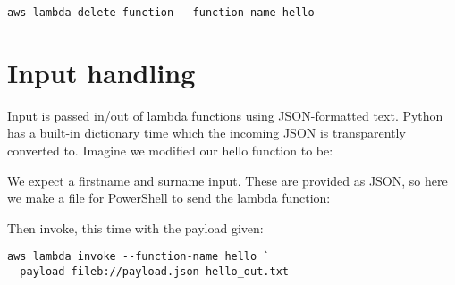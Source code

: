 \documentclass[slides]{pgnotes}
\begin{document}
\begin{verbatim}
aws lambda delete-function --function-name hello
\end{verbatim}

\section{Input handling}\label{input-handling}

Input is passed in/out of lambda functions using JSON-formatted text.
Python has a built-in dictionary time which the incoming JSON is
transparently converted to. Imagine we modified our hello function to
be:

We expect a firstname and surname input. These are provided as JSON, so
here we make a file for PowerShell to send the lambda function:

Then invoke, this time with the payload given:

\begin{verbatim}
aws lambda invoke --function-name hello `
--payload fileb://payload.json hello_out.txt
\end{verbatim}
\end{document}
